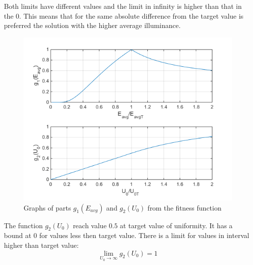 Both limits have different values and the limit in infinity is higher than that in the $0$. This means that for the same absolute difference from the target value is preferred the solution with the higher average illuminance.

\begin{figure}[htb]
  \centering
  \includegraphics[width=\columnwidth]{obrG1G2}
  \caption{Graphs of parts $g_1\left(E_{avg}\right)$ and $g_2\left(U_0\right)$ from the fitness function}
  \label{fig:sidewalk}
\end{figure}

The function $g_2\left(U_{0}\right)$ reach value $0.5$ at target value of uniformity. It has a bound at $0$ for values less then target value. There is a limit for values in interval higher than target value:
\begin{equation}
\label{eq:g2limInf}
\lim_{U_{0}\to \infty} g_2\left(U_{0}\right) = 1
\end{equation}